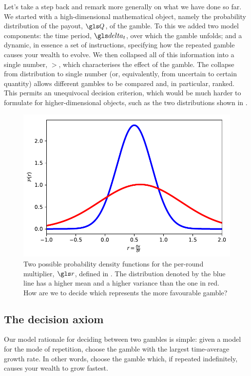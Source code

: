 Let's take a step back and remark more generally on what we have done so far. We 
started with a high-dimensional mathematical object, namely the 
probability distribution of the payout, $\Q$, of the gamble. To this we 
added two model components: the time period, $\dt$, over which the 
gamble unfolds; and a dynamic, in essence a set of instructions, specifying 
how the repeated gamble causes your wealth to evolve. We 
then collapsed all of this information into a single number, 
$\gt$, which characterises the effect of the gamble. The collapse from 
distribution to single number (or, equivalently, from uncertain to certain 
quantity) allows different gambles to be compared and, in particular, 
ranked. This permits an unequivocal decision criterion, which would be 
much harder to formulate for higher-dimensional objects, such as the 
two distributions shown in .
\begin{figure}
\centering
\includegraphics[width=\textwidth]{./chapter_2/figs/two_dists.pdf}
\caption{Two possible probability density functions for the per-round 
multiplier, $\gr$, defined in . The distribution denoted by 
the blue line has a higher mean and a higher variance than the one 
in red. How are we to decide which represents the more favourable 
gamble?}
\end{figure}

\subsection{The decision axiom}
Our model rationale for deciding between two gambles is simple: 
given a model for the mode of repetition, 
choose the gamble with the largest time-average growth rate. 
In other words, choose the gamble which, 
if repeated indefinitely, causes your wealth to grow fastest.

